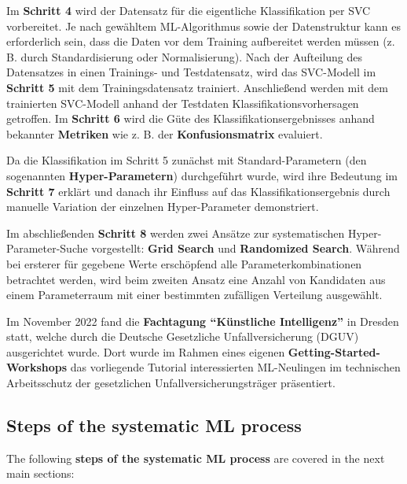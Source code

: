 \documentclass [oneside,10pt,a4paper,ngerman,BCOR10mm,headsepline,parindent,final]{scrartcl}
\begin{document}
Im \textbf{Schritt 4} wird der Datensatz für die eigentliche
Klassifikation per SVC vorbereitet. Je nach gewähltem ML-Algorithmus
sowie der Datenstruktur kann es erforderlich sein, dass die Daten vor
dem Training aufbereitet werden müssen (z. B. durch Standardisierung
oder Normalisierung). Nach der Aufteilung des Datensatzes in einen
Trainings- und Testdatensatz, wird das SVC-Modell im \textbf{Schritt 5}
mit dem Trainingsdatensatz trainiert. Anschließend werden mit dem
trainierten SVC-Modell anhand der Testdaten Klassifikationsvorhersagen
getroffen. Im \textbf{Schritt 6} wird die Güte des
Klassifikationsergebnisses anhand bekannter \textbf{Metriken} wie z. B.
der \textbf{Konfusionsmatrix} evaluiert.

Da die Klassifikation im Schritt 5 zunächst mit Standard-Parametern (den
sogenannten \textbf{Hyper-Parametern}) durchgeführt wurde, wird ihre
Bedeutung im \textbf{Schritt 7} erklärt und danach ihr Einfluss auf das
Klassifikationsergebnis durch manuelle Variation der einzelnen
Hyper-Parameter demonstriert.

Im abschließenden \textbf{Schritt 8} werden zwei Ansätze zur
systematischen Hyper-Parameter-Suche vorgestellt: \textbf{Grid Search}
und \textbf{Randomized Search}. Während bei ersterer für gegebene Werte
erschöpfend alle Parameterkombinationen betrachtet werden, wird beim
zweiten Ansatz eine Anzahl von Kandidaten aus einem Parameterraum mit
einer bestimmten zufälligen Verteilung ausgewählt.

Im November 2022 fand die \textbf{Fachtagung ``Künstliche Intelligenz''}
in Dresden statt, welche durch die Deutsche Gesetzliche
Unfallversicherung (DGUV) ausgerichtet wurde. Dort wurde im Rahmen eines
eigenen \textbf{Getting-Started-Workshops} das vorliegende Tutorial
interessierten ML-Neulingen im technischen Arbeitsschutz der
gesetzlichen Unfallversicherungsträger präsentiert.

    \hypertarget{steps-of-the-systematic-ml-process}{%
\subsection{Steps of the systematic ML
process}\label{steps-of-the-systematic-ml-process}}

The following \textbf{steps of the systematic ML process} are covered in
the next main sections:
\end{document}
